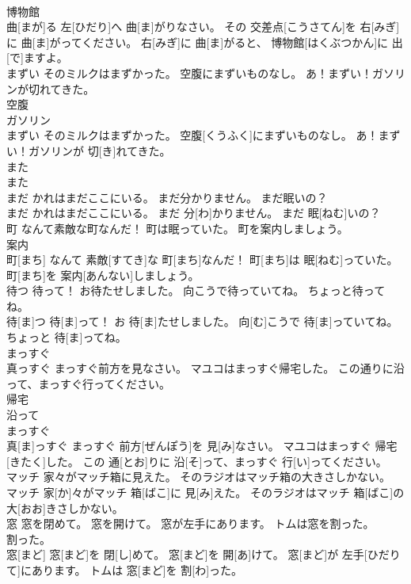 \documentclass[8pt]{extreport}
\begin{document}
\begin{CJK}{UTF8}{min}
\\	博物館 
\\	曲[まが]る 左[ひだり]へ 曲[ま]がりなさい。 その 交差点[こうさてん]を 右[みぎ]に 曲[ま]がってください。 右[みぎ]に 曲[ま]がると、 博物館[はくぶつかん]に 出[で]ますよ。
\\	まずい そのミルクはまずかった。 空腹にまずいものなし。 あ！まずい！ガソリンが切れてきた。	
\\	空腹 
\\	ガソリン 
\\	まずい そのミルクはまずかった。 空腹[くうふく]にまずいものなし。 あ！まずい！ガソリンが 切[き]れてきた。
\\	また	
\\	また
\\	まだ かれはまだここにいる。 まだ分かりません。 まだ眠いの？	
\\	まだ かれはまだここにいる。 まだ 分[わ]かりません。 まだ 眠[ねむ]いの？
\\	町 なんて素敵な町なんだ！ 町は眠っていた。 町を案内しましょう。	
\\	案内 
\\	町[まち] なんて 素敵[すてき]な 町[まち]なんだ！ 町[まち]は 眠[ねむ]っていた。 町[まち]を 案内[あんない]しましょう。
\\	待つ 待って！ お待たせしました。 向こうで待っていてね。 ちょっと待ってね。	
\\	待[ま]つ 待[ま]って！ お 待[ま]たせしました。 向[む]こうで 待[ま]っていてね。 ちょっと 待[ま]ってね。
\\	まっすぐ　
\\	真っすぐ まっすぐ前方を見なさい。 マユコはまっすぐ帰宅した。 この通りに沿って、まっすぐ行ってください。	
\\	帰宅 
\\	沿って 
\\	まっすぐ　
\\	真[ま]っすぐ まっすぐ 前方[ぜんぽう]を 見[み]なさい。 マユコはまっすぐ 帰宅[きたく]した。 この 通[とお]りに 沿[そ]って、まっすぐ 行[い]ってください。
\\	マッチ 家々がマッチ箱に見えた。 そのラジオはマッチ箱の大きさしかない。	
\\	マッチ 家[か]々がマッチ 箱[ばこ]に 見[み]えた。 そのラジオはマッチ 箱[ばこ]の 大[おお]きさしかない。
\\	窓 窓を閉めて。 窓を開けて。 窓が左手にあります。 トムは窓を割った。	
\\	割った。
\\	窓[まど] 窓[まど]を 閉[し]めて。 窓[まど]を 開[あ]けて。 窓[まど]が 左手[ひだりて]にあります。 トムは 窓[まど]を 割[わ]った。

\end{CJK}
\end{document}
